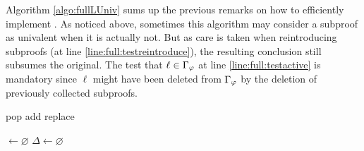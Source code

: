 \documentclass{easychair}
\begin{document}
Algorithm \ref{algo:fullLUniv} sums up the previous remarks on how to efficiently implement
{\LowerUnivalents}. As noticed above, sometimes this algorithm may consider a subproof as univalent when it
is actually not. But as care is taken when reintroducing subproofs (at line \ref{line:full:testreintroduce}),
the resulting conclusion still subsumes the original.  The test that $\ell \in \Gamma_{\varphi}$
at line \ref{line:full:testactive} is mandatory since $\ell$ might have been deleted from
$\Gamma_{\varphi}$ by the deletion of previously collected subproofs.

\begin{algorithm}[pbt]
  \SetAlgoVlined
  \SetAlgoShortEnd

  \BlankLine

   {pop}
   {add}
   {replace}


  \Univ $\leftarrow \varnothing$ \;
  $\Delta \leftarrow \varnothing$ \;
  \BlankLine

\end{algorithm}
\end{document}
